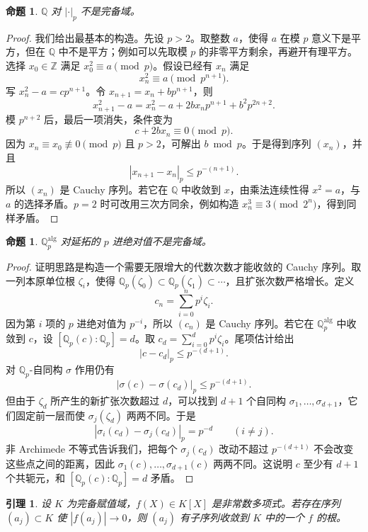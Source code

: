 \documentclass[11pt,a4paper,openany]{ctexbook}
\numberwithin{equation}{chapter}
\newcommand{\Q}{\mathbb{Q}}
\newcommand{\Z}{\mathbb{Z}}
\theoremstyle{plain}
\newtheorem{proposition}[theorem]{命题}
\newtheorem{lemma}[theorem]{引理}
\theoremstyle{definition}
\theoremstyle{remark}
\begin{document}
\begin{proposition}
$\Q$ 对 $|\cdot|_p$ 不是完备域。
\end{proposition}

\begin{proof}
我们给出最基本的构造。先设 $p>2$。取整数 $a$，使得 $a$ 在模 $p$ 意义下是平方，但在 $\Q$ 中不是平方；例如可以先取模 $p$ 的非零平方剩余，再避开有理平方。选择 $x_0\in\Z$ 满足 $x_0^2\equiv a\pmod p$。假设已经有 $x_n$ 满足
\[
  x_n^2\equiv a\pmod {p^{n+1}}.
\]
写 $x_n^2-a=c p^{n+1}$。令 $x_{n+1}=x_n+b p^{n+1}$，则
\[
  x_{n+1}^2-a=x_n^2-a+2b x_n p^{n+1}+b^2p^{2n+2}.
\]
模 $p^{n+2}$ 后，最后一项消失，条件变为
\[
  c+2b x_n\equiv 0\pmod p.
\]
因为 $x_n\equiv x_0\not\equiv 0\pmod p$ 且 $p>2$，可解出 $b\bmod p$。于是得到序列 $(x_n)$，并且
\[
  |x_{n+1}-x_n|_p\le p^{-(n+1)}.
\]
所以 $(x_n)$ 是 Cauchy 序列。若它在 $\Q$ 中收敛到 $x$，由乘法连续性得 $x^2=a$，与 $a$ 的选择矛盾。$p=2$ 时可改用三次方同余，例如构造 $x_n^3\equiv 3\pmod {2^n}$，得到同样矛盾。
\end{proof}

\begin{proposition}
$\Q_p^{\mathrm{alg}}$ 对延拓的 $p$ 进绝对值不是完备域。
\end{proposition}

\begin{proof}
证明思路是构造一个需要无限增大的代数次数才能收敛的 Cauchy 序列。取一列本原单位根 $\zeta_i$，使得 $\Q_p(\zeta_0)\subset \Q_p(\zeta_1)\subset\cdots$，且扩张次数严格增长。定义
\[
  c_n=\sum_{i=0}^n p^i\zeta_i.
\]
因为第 $i$ 项的 $p$ 进绝对值为 $p^{-i}$，所以 $(c_n)$ 是 Cauchy 序列。若它在 $\Q_p^{\mathrm{alg}}$ 中收敛到 $c$，设 $[\Q_p(c):\Q_p]=d$。取 $c_d=\sum_{i=0}^d p^i\zeta_i$。尾项估计给出
\[
  |c-c_d|_p\le p^{-(d+1)}.
\]
对 $\Q_p$-自同构 $\sigma$ 作用仍有
\[
  |\sigma(c)-\sigma(c_d)|_p\le p^{-(d+1)}.
\]
但由于 $\zeta_d$ 所产生的新扩张次数超过 $d$，可以找到 $d+1$ 个自同构 $\sigma_1,\ldots,\sigma_{d+1}$，它们固定前一层而使 $\sigma_j(\zeta_d)$ 两两不同。于是
\[
  |\sigma_i(c_d)-\sigma_j(c_d)|_p=p^{-d}\qquad (i\ne j).
\]
非 Archimede 不等式告诉我们，把每个 $\sigma_j(c_d)$ 改动不超过 $p^{-(d+1)}$ 不会改变这些点之间的距离，因此 $\sigma_1(c),\ldots,\sigma_{d+1}(c)$ 两两不同。这说明 $c$ 至少有 $d+1$ 个共轭元，和 $[\Q_p(c):\Q_p]=d$ 矛盾。
\end{proof}

\begin{lemma}
设 $K$ 为完备赋值域，$f(X)\in K[X]$ 是非常数多项式。若存在序列 $(a_j)\subset K$ 使 $|f(a_j)|\to 0$，则 $(a_j)$ 有子序列收敛到 $K$ 中的一个 $f$ 的根。
\end{lemma}
\end{document}
